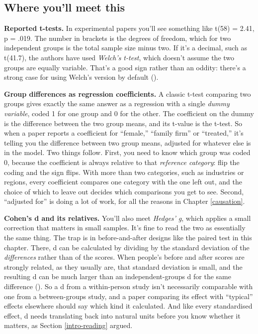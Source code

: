 \documentclass[
]{book}
\begin{document}
\subsection{Where you'll meet this}\label{where-youll-meet-this-5}

\textbf{Reported t-tests.} In experimental papers you'll see something like t(58) = 2.41, p = .019. The number in brackets is the degrees of freedom, which for two independent groups is the total sample size minus two. If it's a decimal, such as t(41.7), the authors have used \emph{Welch's t-test}, which doesn't assume the two groups are equally variable. That's a good sign rather than an oddity: there's a strong case for using Welch's version by default ().

\textbf{Group differences as regression coefficients.} A classic t-test comparing two groups gives exactly the same answer as a regression with a single \emph{dummy variable}, coded 1 for one group and 0 for the other. The coefficient on the dummy is the difference between the two group means, and its t-value is the t-test. So when a paper reports a coefficient for ``female,'' ``family firm'' or ``treated,'' it's telling you the difference between two group means, adjusted for whatever else is in the model. Two things follow. First, you need to know which group was coded 0, because the coefficient is always relative to that \emph{reference category}: flip the coding and the sign flips. With more than two categories, such as industries or regions, every coefficient compares one category with the one left out, and the choice of which to leave out decides which comparisons you get to see. Second, ``adjusted for'' is doing a lot of work, for all the reasons in Chapter \ref{causation}.

\textbf{Cohen's d and its relatives.} You'll also meet \emph{Hedges' g}, which applies a small correction that matters in small samples. It's fine to read the two as essentially the same thing. The trap is in before-and-after designs like the paired test in this chapter. There, d can be calculated by dividing by the standard deviation of the \emph{differences} rather than of the scores. When people's before and after scores are strongly related, as they usually are, that standard deviation is small, and the resulting d can be much larger than an independent-groups d for the same difference (). So a d from a within-person study isn't necessarily comparable with one from a between-groups study, and a paper comparing its effect with ``typical'' effects elsewhere should say which kind it calculated. And like every standardised effect, d needs translating back into natural units before you know whether it matters, as Section \ref{intro-reading} argued.
\end{document}
